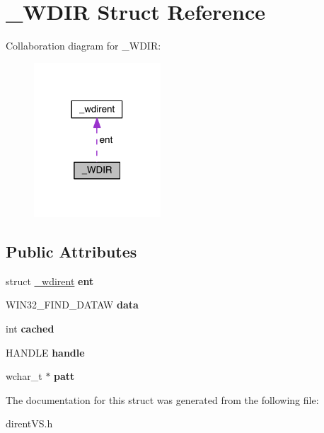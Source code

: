 \hypertarget{struct___w_d_i_r}{}\section{\+\_\+\+W\+D\+IR Struct Reference}
\label{struct___w_d_i_r}


Collaboration diagram for \+\_\+\+W\+D\+IR\+:
\nopagebreak
\begin{figure}[H]
\begin{center}
\leavevmode
\includegraphics[width=134pt]{struct___w_d_i_r__coll__graph}
\end{center}
\end{figure}
\subsection*{Public Attributes}
\begin{DoxyCompactItemize}
\item 
struct \hyperlink{struct__wdirent}{\+\_\+wdirent} {\bfseries ent}\hypertarget{struct___w_d_i_r_a84ae1457352005f813ed4b3dc1994b62}{}\label{struct___w_d_i_r_a84ae1457352005f813ed4b3dc1994b62}

\item 
W\+I\+N32\+\_\+\+F\+I\+N\+D\+\_\+\+D\+A\+T\+AW {\bfseries data}\hypertarget{struct___w_d_i_r_a065b17b666ee06c4e8068d8accb0eef9}{}\label{struct___w_d_i_r_a065b17b666ee06c4e8068d8accb0eef9}

\item 
int {\bfseries cached}\hypertarget{struct___w_d_i_r_a9b7432df163d1e291ba5925347fd4af3}{}\label{struct___w_d_i_r_a9b7432df163d1e291ba5925347fd4af3}

\item 
H\+A\+N\+D\+LE {\bfseries handle}\hypertarget{struct___w_d_i_r_a694510e166fd3e797b3e15b9e4b3810a}{}\label{struct___w_d_i_r_a694510e166fd3e797b3e15b9e4b3810a}

\item 
wchar\+\_\+t $\ast$ {\bfseries patt}\hypertarget{struct___w_d_i_r_a700ff3a1096fb36452c571b0f55b4e60}{}\label{struct___w_d_i_r_a700ff3a1096fb36452c571b0f55b4e60}

\end{DoxyCompactItemize}


The documentation for this struct was generated from the following file\+:\begin{DoxyCompactItemize}
\item 
dirent\+V\+S.\+h\end{DoxyCompactItemize}
